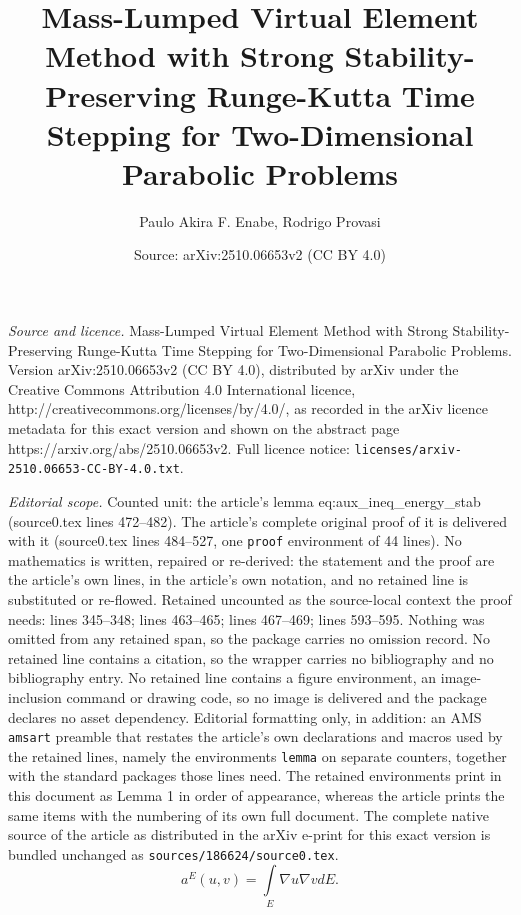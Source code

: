 \documentclass[10pt,a4paper]{amsart}
\title{Mass-Lumped Virtual Element Method with Strong Stability-Preserving Runge-Kutta Time Stepping for Two-Dimensional Parabolic Problems}
\author{Paulo Akira F. Enabe, Rodrigo Provasi}
\date{Source: arXiv:2510.06653v2 (CC BY 4.0)}
\begin{document}
\maketitle

\noindent\emph{Source and licence.} Mass-Lumped Virtual Element Method with Strong Stability-Preserving Runge-Kutta Time Stepping for Two-Dimensional Parabolic Problems. Version arXiv:2510.06653v2 (CC BY 4.0), distributed by arXiv under the Creative Commons Attribution 4.0 International licence, http://creativecommons.org/licenses/by/4.0/, as recorded in the arXiv licence metadata for this exact version and shown on the abstract page https://arxiv.org/abs/2510.06653v2. Full licence notice: \texttt{licenses/arxiv-2510.06653-CC-BY-4.0.txt}.\par\smallskip

\noindent\textit{Editorial scope.} Counted unit: the article's lemma eq:aux\_ineq\_energy\_stab (source0.tex lines 472--482). The article's complete original proof of it is delivered with it (source0.tex lines 484--527, one \texttt{proof} environment of 44 lines). No mathematics is written, repaired or re-derived: the statement and the proof are the article's own lines, in the article's own notation, and no retained line is substituted or re-flowed.  Retained uncounted as the source-local context the proof needs: lines 345--348; lines 463--465; lines 467--469; lines 593--595.  Nothing was omitted from any retained span, so the package carries no omission record.  No retained line contains a citation, so the wrapper carries no bibliography and no bibliography entry.  No retained line contains a figure environment, an image-inclusion command or drawing code, so no image is delivered and the package declares no asset dependency.  Editorial formatting only, in addition: an AMS \texttt{amsart} preamble that restates the article's own declarations and macros used by the retained lines, namely the environments \texttt{lemma} on separate counters, together with the standard packages those lines need.  The retained environments print in this document as Lemma 1 in order of appearance, whereas the article prints the same items with the numbering of its own full document.  The complete native source of the article as distributed in the arXiv e-print for this exact version is bundled unchanged as \texttt{sources/186624/source0.tex}.
\begin{equation}\label{eq:continuous_bilinear_stiff}
    \nonumber
    a^E(u,v) = \int \limits_E \nabla u \nabla v dE.
\end{equation}
\end{document}
